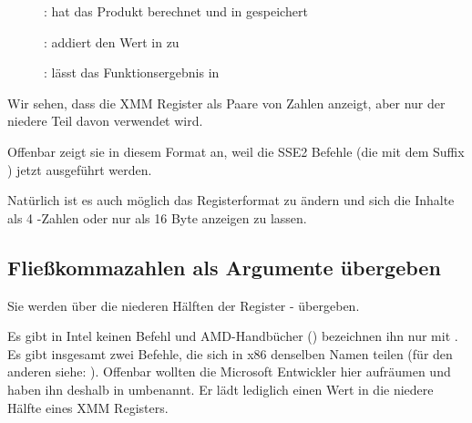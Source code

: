 \clearpage
\begin{figure}[H]
\centering
{}
\caption{\olly:  hat das Produkt berechnet und in  gespeichert}
\label{fig:FPU_SIMD_simple_olly3}
\end{figure}

\clearpage
\begin{figure}[H]
\centering
{}
\caption{\olly:  addiert den Wert in  zu }
\label{fig:FPU_SIMD_simple_olly4}
\end{figure}

\clearpage
\begin{figure}[H]
\centering
{}
\caption{\olly: \FLD lässt das Funktionsergebnis in }
\label{fig:FPU_SIMD_simple_olly5}
\end{figure}
Wir sehen, dass \olly die XMM Register als Paare von \Tdouble Zahlen anzeigt, aber nur der niedere Teil davon verwendet
wird.

Offenbar zeigt \olly sie in diesem Format an, weil die SSE2 Befehle (die mit dem Suffix ) jetzt ausgeführt
werden.

Natürlich ist es auch möglich das Registerformat zu ändern und sich die Inhalte als 4 \Tfloat-Zahlen oder nur als 16
Byte anzeigen zu lassen.

\clearpage
\subsection{Fließkommazahlen als Argumente übergeben}


Sie werden über die niederen Hälften der Register - übergeben.



Es gibt in Intel keinen  Befehl und AMD-Handbücher () bezeichnen ihn nur mit .
Es gibt insgesamt zwei Befehle, die sich in x86 denselben Namen teilen (für den anderen siehe: ).
Offenbar wollten die Microsoft Entwickler hier aufräumen und haben ihn deshalb in  umbenannt.
Er lädt lediglich einen Wert in die niedere Hälfte eines XMM Registers.

